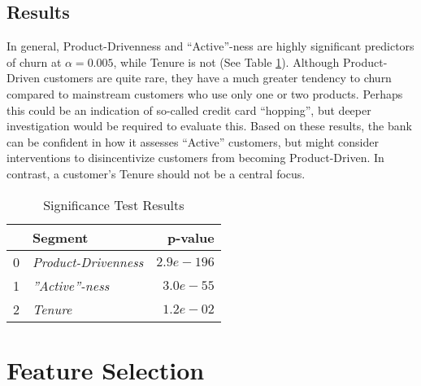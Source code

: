 \documentclass[twoside,twocolumn]{article}
\begin{document}
\subsection*{\large{Results}}
In general, Product-Drivenness and “Active”-ness are highly significant predictors of churn at $\alpha = 0.005$, while Tenure is not (See Table \ref{table:significance}).  Although Product-Driven customers are quite rare, they have a much greater tendency to churn compared to mainstream customers who use only one or two products. Perhaps this could be an indication of so-called credit card “hopping”, but deeper investigation would be required to evaluate this. Based on these results, the bank can be confident in how it assesses “Active” customers, but might consider interventions to disincentivize customers from becoming Product-Driven. In contrast, a customer’s Tenure should not be a central focus.
\begin{table}
  \centering
  \caption{Significance Test Results}
  \begin{tabular}{llr}
    \toprule
    {} &                Segment &        p-value \\
    \midrule
    0 &  \textit{Product-Drivenness} &  $2.9e-196$ \\
    1 &     \textit{''Active''-ness} &   $3.0e-55$ \\
    2 &              \textit{Tenure} &   $1.2e-02$ \\
    \bottomrule  
  \end{tabular}
  \label{table:significance}
\end{table}

\section{Feature Selection}
\end{document}
